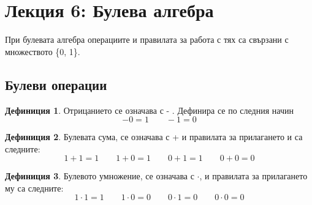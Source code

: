 \documentclass[fleqn, 12pt]{article}
\theoremstyle{definition}
\newtheorem{definition}{Дефиниция}[subsection]
\begin{document}
\newpage

\section{Лекция 6: Булева алгебра }
При булевата алгебра операциите и правилата за работа с тях са свързани с множеството \{0, 1\}.
\subsection{Булеви операции}
\begin{definition}
Отрицанието се означава с - . Дефинира се по следния начин
$$-0 = 1 \qquad -1 = 0$$
\end{definition}
\begin{definition}
Булевата сума, се означава с + и правилата за прилагането и са следните:
$$1+1 = 1 \qquad 1+0 = 1 \qquad 0+1=1 \qquad 0+0 = 0$$
\end{definition}
\begin{definition}
Булевото умножение, се означава с $\cdot$, и правилата за прилагането му са следните:
$$1 \cdot 1 = 1 \qquad 1 \cdot 0 = 0 \qquad 0 \cdot 1=0 \qquad 0 \cdot 0 = 0$$
\end{definition}
\end{document}
